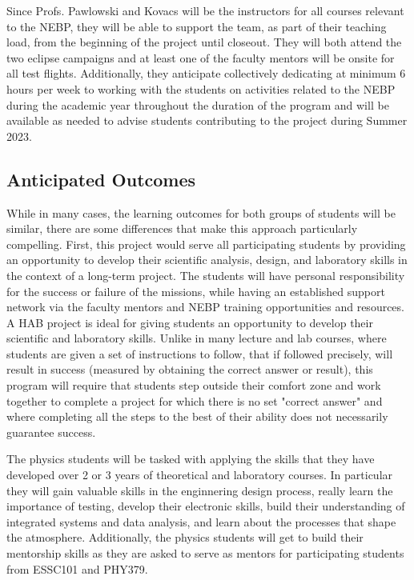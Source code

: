 \documentclass[12pt]{article}
\begin{document}
Since Profs. Pawlowski and Kovacs will be the
instructors for all courses relevant to the NEBP, they will be able to support the
team, as part of their teaching load, from the beginning of the project until
closeout. They will both attend the two eclipse campaigns and at least one
of the faculty mentors will be onsite for all test flights. Additionally,
they anticipate collectively dedicating at minimum 6 hours per week to working with
the students on activities related to the NEBP during the academic year throughout
the duration of the program and will be available as needed to advise students contributing
to the project during Summer 2023.

\subsection{Anticipated Outcomes}
While in many cases, the learning outcomes for both groups of students will be similar, there are
some differences that make this approach particularly compelling. First, this
project would serve all participating students by providing an opportunity to develop
their scientific analysis, design, and laboratory skills in the context of a long-term project. The students will have
personal responsibility for the success or failure of the missions, while having
an established support network via the faculty mentors and NEBP training opportunities and resources.
A HAB project is ideal for giving students an opportunity to develop their scientific and laboratory skills.
Unlike in many lecture and lab courses, where students are given a set of instructions
to follow, that if followed precisely, will result in success (measured by obtaining the correct answer
or result), this program will require that students step outside their comfort zone and work together to
complete a project for which there is no set "correct answer" and where completing all the steps to the
best of their ability does not necessarily guarantee success.

The physics students will be tasked with
applying the skills that they have developed over 2 or 3 years of theoretical and laboratory courses.
In particular they will gain valuable skills in the enginnering design process, really learn the importance
of testing, develop their electronic skills, build their understanding of integrated systems and data analysis,
 and learn
about the processes that shape the atmosphere. Additionally, the physics students will
get to build their mentorship skills as they are asked to serve
as mentors for participating students from ESSC101 and PHY379.
\end{document}

